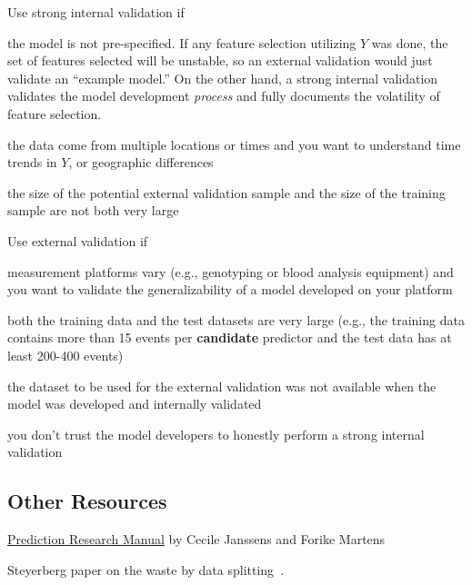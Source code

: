 Use strong internal validation if
\bi
\item the model is not pre-specified.  If any feature selection
  utilizing $Y$ was done, the set of features selected will be
  unstable, so an external validation would just validate an ``example
  model.''  On the other hand, a strong internal validation validates
  the model development \emph{process} and fully documents the
  volatility of feature selection.
\item the data come from multiple locations or times and you want to
  understand time trends in $Y$, or geographic differences
\item the size of the potential external validation sample and the
  size of the training sample are not both very large
\ei

Use external validation if
\bi
\item measurement platforms vary (e.g., genotyping or blood analysis
  equipment) and you want to validate the generalizability of a model
  developed on your platform
\item both the training data and the test datasets are very large
  (e.g., the training data contains more than 15 events per
  \textbf{candidate} predictor and the test data has at least 200-400 events)
\item the dataset to be used for the external validation was not
  available when the model was developed and internally validated
\item you don't trust the model developers to honestly perform a
  strong internal validation
\ei

\subsection{Other Resources}
\bi
\item
  \href{http://www.cecilejanssens.org/wp-content/uploads/2018/01/PredictionManual2.0.pdf}{Prediction Research Manual} by Cecile Janssens and Forike Martens
  \item Steyerberg paper on the waste by data splitting~\cite{ste18vala}.
\ei

\def\apacue{0}
